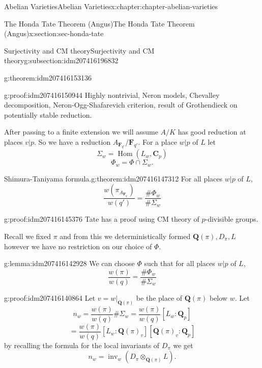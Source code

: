 \documentclass[oneside,10pt,]{book}
\numberwithin{equation}{section}
\newcommand{\QQ}{\mathbf{Q}}
\newcommand{\CC}{\mathbf{C}}
\newcommand{\FF}{\mathbf{F}}
\DeclareMathOperator{\Hom}{Hom}
\begin{document}
\begin{chapterptx}{Abelian Varieties}{}{Abelian Varieties}{}{}{x:chapter:chapter-abelian-varieties}
\begin{sectionptx}{The Honda Tate Theorem (Angus)}{}{The Honda Tate Theorem (Angus)}{}{}{x:section:sec-honda-tate}
\begin{subsectionptx}{Surjectivity and CM theory}{}{Surjectivity and CM theory}{}{}{g:subsection:idm207416196832}
\begin{theorem}{}{}{g:theorem:idm207416153136}
\end{theorem}
\begin{proofptx}{}{g:proof:idm207416150944}
Highly nontrivial, Neron models, Chevalley decomposition, Neron-Ogg-Shafarevich criterion, result of Grothendieck on potentially stable reduction.%
\end{proofptx}
After passing to a finite extension we will assume \(A/K\) has good reduction at places \(v|p\). So we have a reduction \(A_{\FF_{q'}}/\FF_{q'}\). For a place \(w|p\) of \(L\) let%
\begin{equation*}
\Sigma_w = \Hom(L_w, \CC_p)
\end{equation*}
%
\begin{equation*}
\Phi_w = \Phi \cap \Sigma_w\text{.}
\end{equation*}
%
\begin{theorem}{Shimura-Taniyama formula.}{}{g:theorem:idm207416147312}%
For all places \(w|p\) of \(L\),%
\begin{equation*}
\frac{w(\pi_{A_{\FF_{q'}}})}{w(q')} = \frac{\#\Phi_w}{\#\Sigma_w}
\end{equation*}
%
\end{theorem}
\begin{proofptx}{}{g:proof:idm207416145376}
Tate has a proof using CM theory of \(p\)-divisible groups.%
\end{proofptx}
Recall we fixed \(\pi\) and from this we deterministically formed \(\QQ(\pi), D_{\pi}, L\) however we have no restriction on our choice of \(\Phi\).%
\begin{lemma}{}{}{g:lemma:idm207416142928}%
We can choose \(\Phi\) such that for all places \(w|p\) of \(L\),%
\begin{equation*}
\frac{w(\pi)}{w(q)} = \frac{\#\Phi_w}{\#\Sigma_w}
\end{equation*}
%
\end{lemma}
\begin{proofptx}{}{g:proof:idm207416140864}
Let \(v = w|_{\QQ(\pi)}\) be the place of \(\QQ(\pi)\) below \(w\). Let%
\begin{equation*}
n_w = \frac{w(\pi)}{w(q)}\#\Sigma_w = \frac{w(\pi)}{w(q)}[L_w :\QQ_p]
\end{equation*}
%
\begin{equation*}
= \frac{w(\pi)}{w(q)}[L_w :\QQ(\pi)_v ][ \QQ(\pi)_v:\QQ_p]
\end{equation*}
by recalling the formula for the local invariants of \(D_\pi\) we get%
\begin{equation*}
n_w = \operatorname{inv}_w(D_\pi\otimes_{\QQ(\pi)} L)\text{.}

\end{equation*}
\end{proofptx}
\end{subsectionptx}
\end{sectionptx}
\end{chapterptx}
\end{document}
